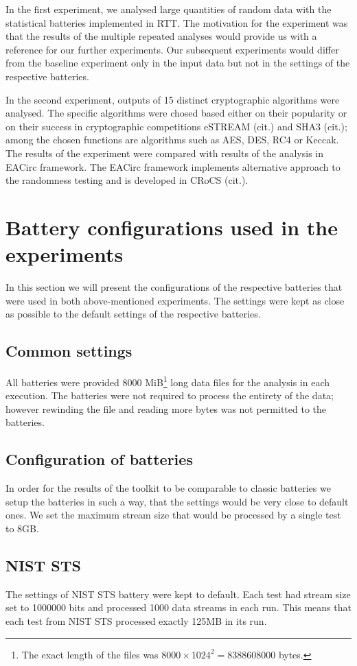 \documentclass[
  digital,  	%
  color,		%
  oneside,   	%
  12pt,
  nocover,
  notable,
  nolof,
  nolot,
]{fithesis3}
\begin{document}
In the first experiment, we analysed large quantities of random data with the statistical batteries implemented in RTT. The motivation for the experiment was that the results of the multiple repeated analyses would provide us with a reference for our further experiments. Our subsequent experiments would differ from the baseline experiment only in the input data but not in the settings of the respective batteries.

In the second experiment, outputs of 15 distinct cryptographic algorithms were analysed. The specific algorithms were chosed based either on their popularity or on their success in cryptographic competitions eSTREAM (cit.) and SHA3 (cit.); among the chosen functions are algorithms such as AES, DES, RC4 or Keccak. The results of the experiment were compared with results of the analysis in EACirc framework. The EACirc framework implements alternative approach to the randomness testing and is developed in CRoCS (cit.).

\section{Battery configurations used in the experiments}
\label{sec:configuration_of_batteries}
In this section we will present the configurations of the respective batteries that were used in both above-mentioned experiments. The settings were kept as close as possible to the default settings of the respective batteries.

\subsection{Common settings}
All batteries were provided 8000 MiB\footnote{The exact length of the files was $8000 \times 1024^2 = 8388608000$ bytes.} long data files for the analysis in each execution. The batteries were not required to process the entirety of the data; however rewinding the file and reading more bytes was not permitted to the batteries.

\subsection{Configuration of batteries}
In order for the results of the toolkit to be comparable to classic batteries we setup the batteries in such a way, that the settings would be very close to default ones. We set the maximum stream size that would be processed by a single test to 8GB.

\subsection*{NIST STS}
The settings of NIST STS battery were kept to default. Each test had stream size set to 1000000 bits and processed 1000 data streams in each run. This means that each test from NIST STS processed exactly 125MB in its run. 
\end{document}
